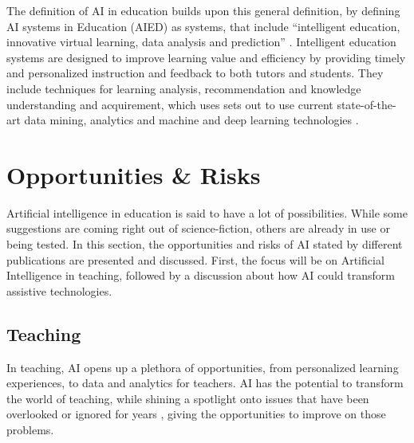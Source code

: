 \documentclass{Academic}
\begin{document}
    The definition of AI in education builds upon this general definition, by defining AI systems in Education (AIED) as systems, that include \enquote{intelligent education, innovative virtual learning, data analysis and prediction} \cite{chen_artificial_2020}. Intelligent education systems are designed to improve learning value and efficiency by providing timely and personalized instruction and feedback to both tutors and students. They include techniques for learning analysis, recommendation and knowledge understanding and acquirement, which uses sets out to use current state-of-the-art data mining, analytics and machine and deep learning technologies \cite{chen_artificial_2020}.

    \section{Opportunities \& Risks}
    Artificial intelligence in education is said to have a lot of possibilities. While some suggestions are coming right out of science-fiction, others are already in use or being tested. In this section, the opportunities and risks of AI stated by different publications are presented and discussed. First, the focus will be on Artificial Intelligence in teaching, followed by a discussion about how AI could transform assistive technologies.

    \subsection{Teaching}
    In teaching, AI opens up a plethora of opportunities, from personalized learning experiences, to data and analytics for teachers. AI has the potential to transform the world of teaching, while shining a spotlight onto issues that have been overlooked or ignored for years \cite{holmes_artificial_2023}, giving the opportunities to improve on those problems.
\end{document}
